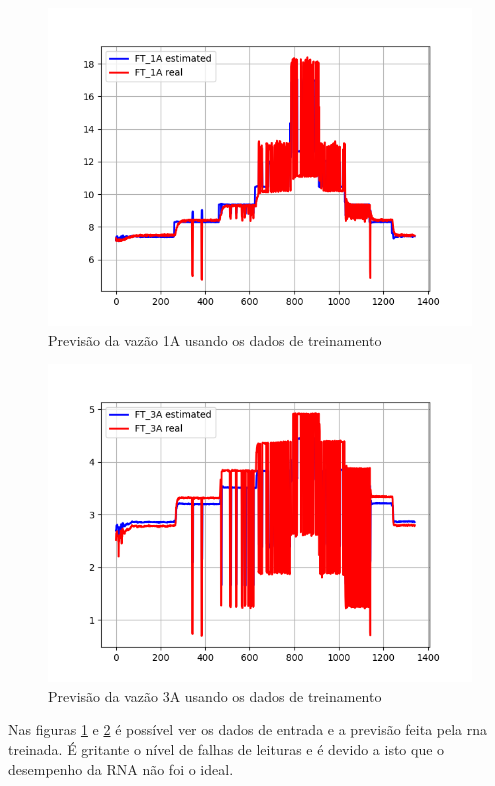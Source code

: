 \documentclass[12pt]{article}
\begin{document}
\begin{figure}
    \centering
    \includegraphics{results/initial-training-1A.png}
    \caption{Previsão da vazão 1A usando os dados de treinamento}
    \label{fig:initial-training-1A}
\end{figure}

\begin{figure}
    \centering
    \includegraphics{results/initial-training-3A.png}
    \caption{Previsão da vazão 3A usando os dados de treinamento}
    \label{fig:initial-training-3A}
\end{figure}

Nas figuras \ref{fig:initial-training-1A} e \ref{fig:initial-training-3A} é possível ver os dados de entrada e a previsão feita pela \acrshort{rna} treinada. É gritante o nível de falhas de leituras e é devido a isto que o desempenho da RNA não foi o ideal.
\end{document}
